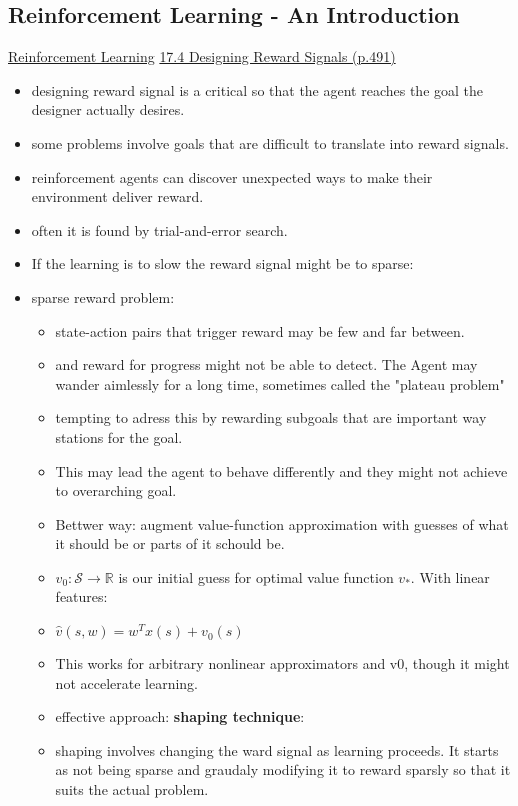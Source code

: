 \subsection{Reinforcement Learning - An Introduction} 
\href{http://incompleteideas.net/book/the-book.html}{Reinforcement Learning}
\underline{17.4 Designing Reward Signals (p.491)}
\begin{itemize}[noitemsep,nolistsep]
	\item designing reward signal is a critical so that the agent reaches the goal the designer actually desires.
	\item some problems involve goals that are difficult to translate into reward signals.
	\item reinforcement agents can discover unexpected ways to make their environment deliver reward.
	\item often it is found by trial-and-error search.
	\item If the learning is to slow the reward signal might be to sparse:
	\item sparse reward problem:
	\begin{itemize}[noitemsep,nolistsep]
		\item state-action pairs that trigger reward may be few and far between.
		\item and reward for progress might not be able to detect. The Agent may wander aimlessly for a long time, sometimes called the "plateau problem"
		\item tempting to adress this by rewarding subgoals that are important way stations for the goal.
		\item This may lead the agent to behave differently and they might not achieve to overarching goal.
		\item Bettwer way: augment value-function approximation with guesses of what it should be or parts of it schould be.
		\item $v_0: \mathcal{S} \rightarrow \mathbb{R}$ is our initial guess for optimal value function $v_*$. With linear features:
		\item $\hat{v}(s,w) = w^Tx(s) + v_0(s)$
		\item This works for arbitrary nonlinear approximators and v0, though it might not accelerate learning.
		\item effective approach: \textbf{shaping technique}:
		\item shaping involves changing the ward signal as learning proceeds. It starts as not being sparse and graudaly modifying it to reward sparsly so that it suits the actual problem.

\end{itemize}
\end{itemize}
